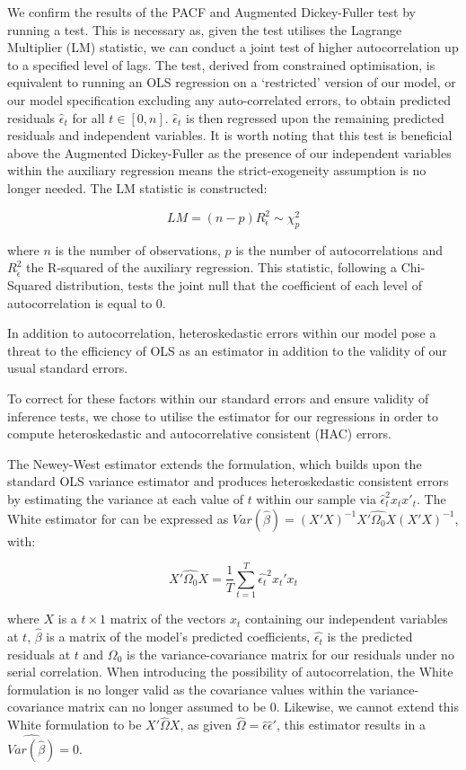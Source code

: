 \documentclass[12pt]{article}
\numberwithin{table}{section}   %
\begin{document}
We confirm the results of the PACF and Augmented Dickey-Fuller test by running a \citet{breusch} \citet{godfrey} test. This is necessary as, given the test utilises the Lagrange Multiplier (LM) statistic, we can conduct a joint test of higher autocorrelation up to a specified level of lags. The test, derived from constrained optimisation, is equivalent to running an OLS regression on a ‘restricted’ version of our model, or our model specification excluding any auto-correlated errors, to obtain predicted residuals $\hat{\epsilon}_t$ for all $t\in[0,n]$. $\hat{\epsilon}_t$ is then regressed upon the remaining predicted residuals and independent variables. It is worth noting that this test is beneficial above the Augmented Dickey-Fuller as the presence of our independent variables within the auxiliary regression means the strict-exogeneity assumption is no longer needed. The LM statistic is constructed:

$$
LM=(n-p)R^2_{\hat{\epsilon}} \sim\chi^2_p
$$

where $n$ is the number of observations, $p$ is the number of autocorrelations and $R^2_{\hat{\epsilon}}$ the R-squared of the auxiliary regression. This statistic, following a Chi-Squared distribution, tests the joint null that the coefficient of each level of autocorrelation is equal to 0.

In addition to autocorrelation, heteroskedastic errors within our model pose a threat to the efficiency of OLS as an estimator in addition to the validity of our usual standard errors.

To correct for these factors within our standard errors and ensure validity of inference tests, we chose to utilise the \citet{newey} estimator for our regressions in order to compute heteroskedastic and autocorrelative consistent (HAC) errors.

The Newey-West estimator extends the \citet{white} formulation, which builds upon the standard OLS variance estimator and produces heteroskedastic consistent errors by estimating the variance at each value of $t$ within our sample via $\hat{\epsilon}^2_tx_tx'_t$. The White estimator for can be expressed as $Var(\hat{\beta})=(X'X)^{-1}X'\hat{\Omega_0}X(X'X)^{-1}$, with:

$$
X'\hat{\Omega_0}X=\frac{1}{T}\sum_{t=1}^T\hat{\epsilon_t}^2x_t'x_t
$$

where $X$ is a $t\times1$ matrix of the vectors $x_t$ containing our independent variables at $t$, $\hat{\beta}$ is a matrix of the model’s predicted coefficients, $\hat{\epsilon_t}$ is the predicted residuals at $t$ and $\Omega_0$ is the variance-covariance matrix for our residuals under no serial correlation. When introducing the possibility of autocorrelation, the White formulation is no longer valid as the covariance values within the variance-covariance matrix can no longer assumed to be 0. Likewise, we cannot extend this White formulation to be $X'\hat{\Omega}X$, as given $\hat{\Omega}=\hat{\epsilon}\hat{\epsilon}'$, this estimator results in a $\widehat{Var(\hat{\beta})}=0$.
\end{document}
